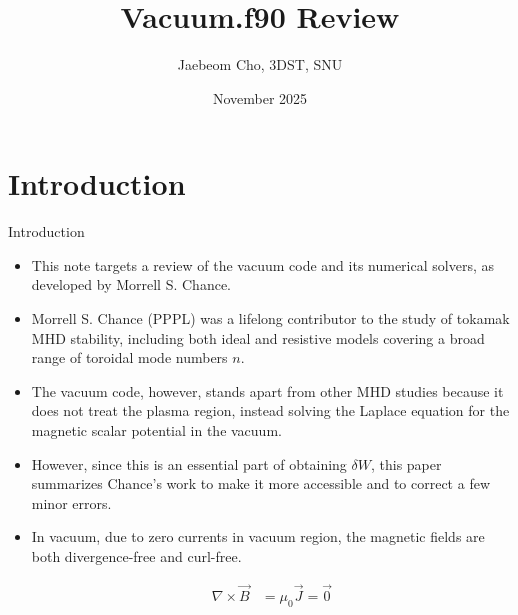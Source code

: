 \documentclass[8pt]{beamer}
\title{\color{white}Vacuum.f90 Review}
\author{Jaebeom Cho, 3DST, SNU}
\date{November 2025}
\begin{document}
\maketitle

\section{Introduction}
\begin{frame}{\color{white}Introduction}
    \begin{itemize}
        \item This note targets a review of the vacuum code and its numerical solvers, as developed by Morrell S. Chance.
        \item Morrell S. Chance (PPPL) was a lifelong contributor to the study of tokamak MHD stability, including both ideal and resistive models covering a broad range of toroidal mode numbers $n$.
        \item The vacuum code, however, stands apart from other MHD studies because it does not treat the plasma region, instead solving the Laplace equation for the magnetic scalar potential in the vacuum.
        \item However, since this is an essential part of obtaining $\delta W$, this paper summarizes Chance's work to make it more accessible and to correct a few minor errors.
        \item In vacuum, due to zero currents in vacuum region, the magnetic fields are both divergence-free and curl-free.
    
        \begin{align}
            \nabla \times \vec{B} &= \mu_0 \vec{J} =\vec{0}
        \end{align}
    \end{itemize}
\end{frame}
\end{document}
